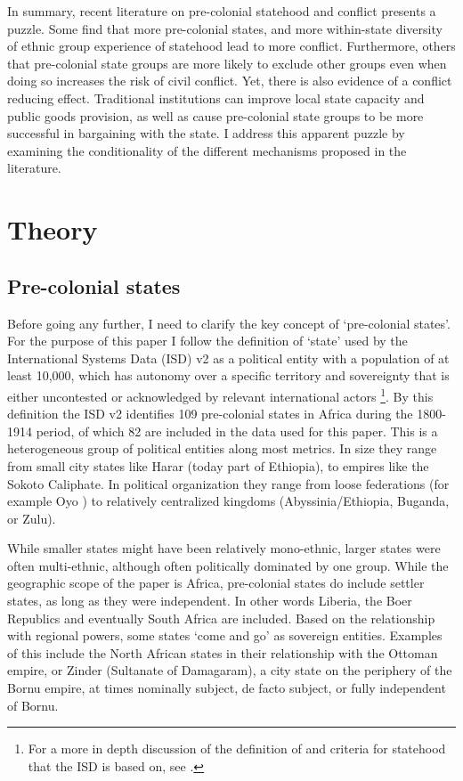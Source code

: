 \documentclass[12pt]{article}
\begin{document}
In summary, recent literature on pre-colonial statehood and conflict presents a
puzzle. Some find that more pre-colonial states, and more within-state diversity
of ethnic group experience of statehood lead to more conflict. Furthermore,
others that pre-colonial state groups are more likely to exclude other groups
even when doing so increases the risk of civil conflict. Yet, there is also
evidence of a conflict reducing effect. Traditional institutions can improve
local state capacity and public goods provision, as well as cause pre-colonial
state groups to be more successful in bargaining with the state. I address this
apparent puzzle by examining the conditionality of the different mechanisms
proposed in the literature.

\section{Theory}
\label{Theory} 

\subsection{Pre-colonial states} \label{Pre-colonial states}

Before going any further, I need to clarify the key concept of `pre-colonial
states'. For the purpose of this paper I follow the definition of `state' used
by the International Systems Data (ISD) v2 \citep{Butcher2020} as a political
entity with a population of at least 10,000, which has autonomy over a specific
territory and sovereignty that is either uncontested or acknowledged by relevant
international actors \citep{Butcher2020}\footnote{For a more in depth discussion
	of the definition of and criteria for statehood that the ISD is based
on, see \citet{Butcher2017}.}. By this definition the ISD v2 identifies 109
pre-colonial states in Africa during the 1800-1914 period, of which 82 are
included in the data used for this paper. This is a heterogeneous group of
political entities along most metrics. In size they range from small city states
like Harar (today part of Ethiopia), to empires like the Sokoto Caliphate. In
political organization they range from loose federations (for example Oyo
\citep{Law1977}) to relatively centralized kingdoms (Abyssinia/Ethiopia,
Buganda, or Zulu).

While smaller states might have been relatively mono-ethnic, larger states were
often multi-ethnic, although often politically dominated by one group. While the
geographic scope of the paper is Africa, pre-colonial states do include settler
states, as long as they were independent. In other words Liberia, the Boer
Republics and eventually South Africa are included. Based on the relationship
with regional powers, some states `come and go' as sovereign entities. Examples
of this include the North African states in their relationship with the Ottoman
empire, or Zinder (Sultanate of Damagaram), a city state on the periphery of the
Bornu empire, at times nominally subject, de facto subject, or fully independent
of Bornu.
\end{document}
